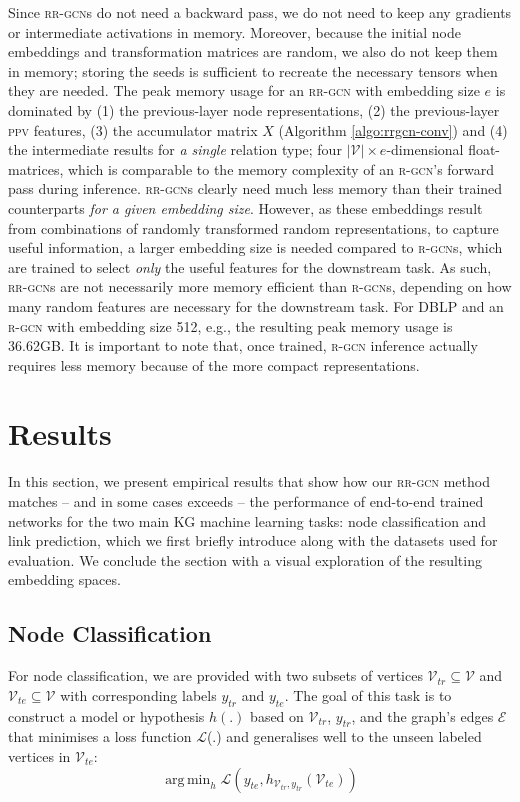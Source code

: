 \documentclass{llncs}
\DeclareMathOperator*{\argmin}{arg\,min}
\begin{document}
Since \textsc{rr-gcn}s do not need a backward pass, we do not need to keep any gradients or intermediate activations in memory. Moreover, because the initial node embeddings and transformation matrices are random, we also do not keep them in memory; storing the seeds is sufficient to recreate the necessary tensors when they are needed. The peak memory usage for an \textsc{rr-gcn} with embedding size $e$ is dominated by (1) the previous-layer node representations, (2) the previous-layer \textsc{ppv} features, (3) the accumulator matrix $X$ (Algorithm \ref{algo:rrgcn-conv}) and (4) the intermediate results for \textit{a single} relation type; four $|\mathcal{V}| \times e$-dimensional float-matrices, which is comparable to the memory complexity of an \textsc{r-gcn}'s forward pass during inference. \textsc{rr-gcn}s clearly need much less memory than their trained counterparts \textit{for a given embedding size}.
However, as these embeddings result from combinations of randomly transformed random representations, to capture useful information, a larger embedding size is needed compared to \textsc{r-gcn}s, which are trained to select \textit{only} the useful features for the downstream task.
As such, \textsc{rr-gcn}s are not necessarily more memory efficient than \textsc{r-gcn}s, depending on how many random features are necessary for the downstream task. For DBLP and an \textsc{r-gcn} with embedding size 512, e.g., the resulting peak memory usage is 36.62GB.
It is important to note that, once trained, \textsc{r-gcn} inference actually requires less memory because of the more compact representations.

\section{Results} \label{sec:results}
In this section, we present empirical results that show how our \textsc{rr-gcn} method matches -- and in some cases exceeds -- the performance of end-to-end trained networks for the two main KG machine learning tasks: node classification and link prediction, which we first briefly introduce along with the datasets used for evaluation. We conclude the section with a visual exploration of the resulting embedding spaces.

\subsection{Node Classification}
For node classification, we are provided with two subsets of vertices $\mathcal{V}_{tr} \subseteq \mathcal{V}$ and $\mathcal{V}_{te} \subseteq \mathcal{V}$ with corresponding labels $y_{tr}$ and $y_{te}$. The goal of this task is to construct a model or hypothesis $h(.)$ based on $\mathcal{V}_{tr}$, $y_{tr}$, and the graph's edges $\mathcal{E}$ that minimises a loss function $\mathcal{L}$(.) and generalises well to the unseen labeled vertices in $\mathcal{V}_{te}$:
\begin{equation}
    \argmin_{h} \mathcal{L}(y_{te}, h_{\mathcal{V}_{tr}, y_{tr}}(\mathcal{V}_{te}))
\end{equation}
\end{document}
